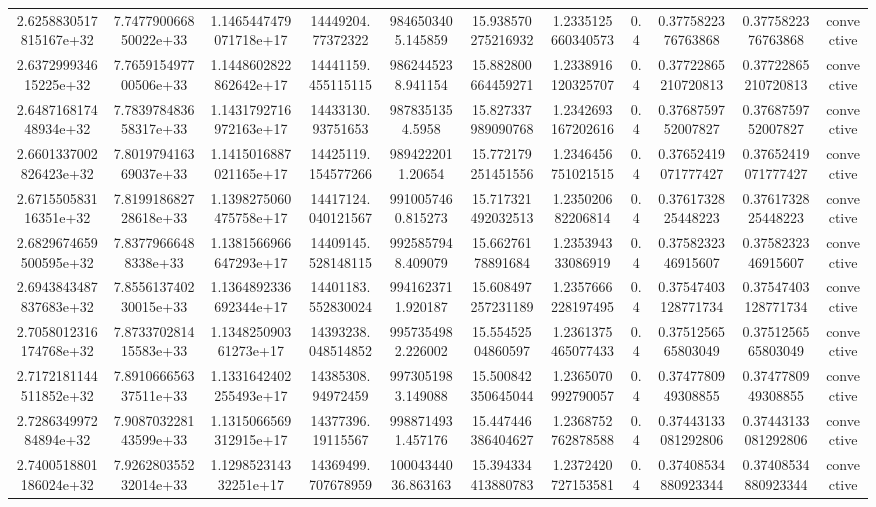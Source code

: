 \begin{table}
\begin{tabular}{ccccccccccc}
2.6258830517815167e+32 & 7.747790066850022e+33 & 1.1465447479071718e+17 & 14449204.77372322 & 9846503405.145859 & 15.938570275216932 & 1.2335125660340573 & 0.4 & 0.3775822376763868 & 0.3775822376763868 & convective \\
2.637299934615225e+32 & 7.765915497700506e+33 & 1.1448602822862642e+17 & 14441159.455115115 & 9862445238.941154 & 15.882800664459271 & 1.2338916120325707 & 0.4 & 0.37722865210720813 & 0.37722865210720813 & convective \\
2.648716817448934e+32 & 7.783978483658317e+33 & 1.1431792716972163e+17 & 14433130.93751653 & 9878351354.5958 & 15.827337989090768 & 1.2342693167202616 & 0.4 & 0.3768759752007827 & 0.3768759752007827 & convective \\
2.6601337002826423e+32 & 7.801979416369037e+33 & 1.1415016887021165e+17 & 14425119.154577266 & 9894222011.20654 & 15.772179251451556 & 1.2346456751021515 & 0.4 & 0.37652419071777427 & 0.37652419071777427 & convective \\
2.671550583116351e+32 & 7.819918682728618e+33 & 1.1398275060475758e+17 & 14417124.040121567 & 9910057460.815273 & 15.717321492032513 & 1.235020682206814 & 0.4 & 0.3761732825448223 & 0.3761732825448223 & convective \\
2.6829674659500595e+32 & 7.83779666488338e+33 & 1.1381566966647293e+17 & 14409145.528148115 & 9925857948.409079 & 15.66276178891684 & 1.235394333086919 & 0.4 & 0.3758232346915607 & 0.3758232346915607 & convective \\
2.6943843487837683e+32 & 7.855613740230015e+33 & 1.1364892336692344e+17 & 14401183.552830024 & 9941623711.920187 & 15.608497257231189 & 1.2357666228197495 & 0.4 & 0.37547403128771734 & 0.37547403128771734 & convective \\
2.7058012316174768e+32 & 7.873370281415583e+33 & 1.134825090361273e+17 & 14393238.048514852 & 9957354982.226002 & 15.55452504860597 & 1.2361375465077433 & 0.4 & 0.3751256565803049 & 0.3751256565803049 & convective \\
2.7172181144511852e+32 & 7.891066656337511e+33 & 1.1331642402255493e+17 & 14385308.94972459 & 9973051983.149088 & 15.500842350645044 & 1.2365070992790057 & 0.4 & 0.3747780949308855 & 0.3747780949308855 & convective \\
2.728634997284894e+32 & 7.908703228143599e+33 & 1.1315066569312915e+17 & 14377396.19115567 & 9988714931.457176 & 15.447446386404627 & 1.2368752762878588 & 0.4 & 0.37443133081292806 & 0.37443133081292806 & convective \\
2.7400518801186024e+32 & 7.926280355232014e+33 & 1.129852314332251e+17 & 14369499.707678959 & 10004344036.863163 & 15.394334413880783 & 1.2372420727153581 & 0.4 & 0.37408534880923344 & 0.37408534880923344 & convective \\

\end{tabular}
\end{table}

